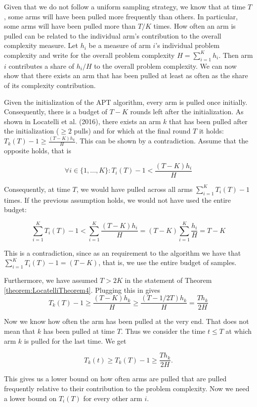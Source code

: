 \documentclass[11pt,]{article}
\begin{document}
Given that we do not follow a uniform sampling strategy, we know that at
time \(T\), some arms will have been pulled more frequently than others.
In particular, some arms will have been pulled more than \(T/K\) times.
How often an arm is pulled can be related to the individual arm's
contribution to the overall complexity measure. Let \(h_i\) be a measure
of arm \(i\)'s individual problem complexity and write for the overall
problem complexity \(H = \sum_{i = 1}^{K} h_i\). Then arm \(i\)
contributes a share of \(h_i/H\) to the overall problem complexity. We
can now show that there exists an arm that has been pulled at least as
often as the share of its complexity contribution.

Given the initialization of the APT algorithm, every arm is pulled once
initially. Consequently, there is a budget of \(T-K\) rounds left after
the initialization. As shown in Locatelli et al. (2016), there exists an
arm \(k\) that has been pulled after the initialization (\(\geq 2\)
pulls) and for which at the final round \(T\) it holds:
\(T_k(T) - 1 \geq \frac{(T-K)h_k}{H}\). This can be shown by a
contradiction. Assume that the opposite holds, that is

\[
\forall i \in \{1,...,K\}: T_i(T) - 1 < \frac{(T-K)h_i}{H}
\]

Consequently, at time \(T\), we would have pulled across all arms
\(\sum_{i=1}^KT_i(T)-1\) times. If the previous assumption holds, we
would not have used the entire budget:

\[
\sum_{i=1}^K T_i(T)-1 < \sum_{i=1}^K \frac{(T-K)h_i}{H} = (T-K)\sum_{i=1}^K \frac{h_i}{H} = T-K
\]

This is a contradiction, since as an requirement to the algorithm we
have that \(\sum_{i=1}^K T_i(T)-1 = (T-K)\), that is, we use the entire
budget of samples.

Furthermore, we have assumed \(T>2K\) in the statement of Theorem
\ref{theorem:LocatelliTheorem4}. Plugging this in gives \[
T_k(T) - 1 \geq \frac{(T-K)h_k}{H} \geq \frac{(T-1/2T)h_k}{H} = \frac{Th_k}{2H}
\]

Now we know how often the arm has been pulled at the very end. That does
not mean that \(k\) has been pulled at time \(T\). Thus we consider the
time \(t \leq T\) at which arm \(k\) is pulled for the last time. We get

\[
T_k(t) \geq T_k(T) - 1 \geq \frac{Th_k}{2H}.
\]

This gives us a lower bound on how often arms are pulled that are pulled
frequently relative to their contribution to the problem complexity. Now
we need a lower bound on \(T_i(T)\) for every other arm \(i\).
\end{document}
